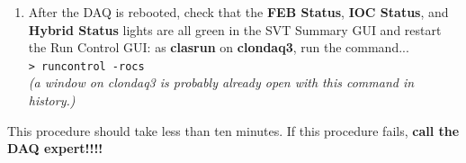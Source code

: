 \documentclass[letter,12pt]{article}
\begin{document}
\begin{enumerate}
\item After the DAQ is rebooted, check that the \textbf{FEB Status}, \textbf{IOC Status}, and \textbf{Hybrid Status} lights are all green in the SVT Summary GUI and restart the Run Control GUI: as \textbf{clasrun} on \textbf{clondaq3}, run the command... \\ 
\texttt{> runcontrol -rocs} \\
\textit{(a window on clondaq3 is probably already open with this command in history.)}\\
\end{enumerate}

This procedure should take less than ten minutes. If this procedure fails, \textbf{call the DAQ expert!!!!}
\end{document}
